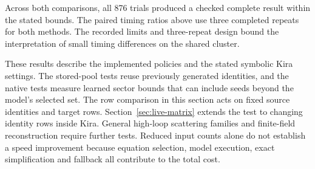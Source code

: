 \FloatBarrier
Across both comparisons, all 876 trials produced a
checked complete result within the stated bounds. The paired timing
ratios above use three completed repeats for both methods.
The recorded limits and three-repeat design bound the interpretation
of small timing differences on the shared cluster.

These results describe the implemented policies and the stated
symbolic Kira settings. The stored-pool tests reuse previously
generated identities, and the native tests measure learned sector
bounds that can include seeds beyond the model's selected set.
The row comparison in this section acts on fixed source identities and target rows.
Section~\ref{sec:live-matrix} extends the test to changing identity rows inside Kira.
General high-loop scattering families and finite-field reconstruction
require further tests. Reduced input counts alone do not establish
a speed improvement because equation selection, model execution,
exact simplification and fallback all contribute to the total cost.
\FloatBarrier
